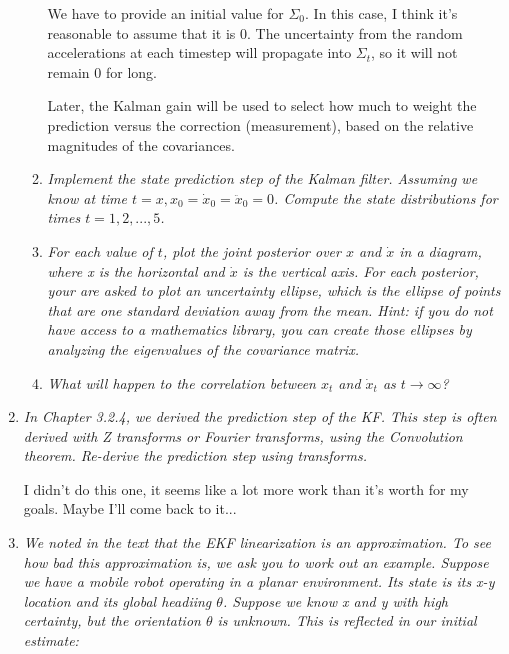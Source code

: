 \documentclass[10pt]{article}
\begin{document}
\begin{enumerate}
\begin{enumerate}
      We have to provide an initial value for $\Sigma_0$. In this case, I think it's
      reasonable to assume that it is $0$. The uncertainty from the random
      accelerations at each timestep will propagate into $\Sigma_t$, so it will not
      remain $0$ for long.

      Later, the Kalman gain will be used to select how much to weight the
      prediction versus the correction (measurement), based on the relative
      magnitudes of the covariances.

    \item \textit{Implement the state prediction step of the Kalman filter. Assuming
        we know at time $t=x, x_0 = \dot{x}_0 = \ddot{x}_0 = 0$. Compute the state
      distributions for times $t=1,2,...,5$.}

    \item \textit{For each value of $t$, plot the joint posterior over $x$ and
        $\dot{x}$ in a diagram, where x is the horizontal and $\dot{x}$ is the
        vertical axis. For each posterior, your are asked to plot an uncertainty
        ellipse, which is the ellipse of points that are one standard deviation away
        from the mean. Hint: if you do not have access to a mathematics library, you
        can create those ellipses by analyzing the eigenvalues of the covariance
      matrix.}

    \item \textit{What will happen to the correlation between $x_t$ and $\dot{x}_t$
      as $t\to \infty$?}

  \end{enumerate}

  \item \textit{In Chapter 3.2.4, we derived the prediction step of the KF. This
    step is often derived with Z transforms or Fourier transforms, using the
    Convolution theorem. Re-derive the prediction step using transforms.}
    
    I didn't do this one, it seems like a lot more work than it's worth for my
    goals. Maybe I'll come back to it...
 
  \item \textit{We noted in the text that the EKF linearization is an
    approximation. To see how bad this approximation is, we ask you to work out
    an example. Suppose we have a mobile robot operating in a planar environment.
    Its state is its x-y location and its global headiing $\theta$. Suppose we know
    x and y with high certainty, but the orientation $\theta$ is unknown. This is
    reflected in our initial estimate:}
    

\end{enumerate}
\end{document}
